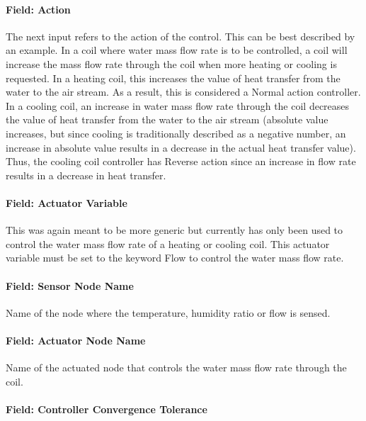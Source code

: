 \paragraph{Field: Action}\label{field-action}

The next input refers to the action of the control. This can be best described by an example. In a coil where water mass flow rate is to be controlled, a coil will increase the mass flow rate through the coil when more heating or cooling is requested. In a heating coil, this increases the value of heat transfer from the water to the air stream. As a result, this is considered a Normal action controller. In a cooling coil, an increase in water mass flow rate through the coil decreases the value of heat transfer from the water to the air stream (absolute value increases, but since cooling is traditionally described as a negative number, an increase in absolute value results in a decrease in the actual heat transfer value). Thus, the cooling coil controller has Reverse action since an increase in flow rate results in a decrease in heat transfer.

\paragraph{Field: Actuator Variable}\label{field-actuator-variable}

This was again meant to be more generic but currently has only been used to control the water mass flow rate of a heating or cooling coil. This actuator variable must be set to the keyword Flow to control the water mass flow rate.

\paragraph{Field: Sensor Node Name}\label{field-sensor-node-name}

Name of the node where the temperature, humidity ratio or flow is sensed.

\paragraph{Field: Actuator Node Name}\label{field-actuator-node-name}

Name of the actuated node that controls the water mass flow rate through the coil.

\paragraph{Field: Controller Convergence Tolerance}\label{field-controller-convergence-tolerance}

